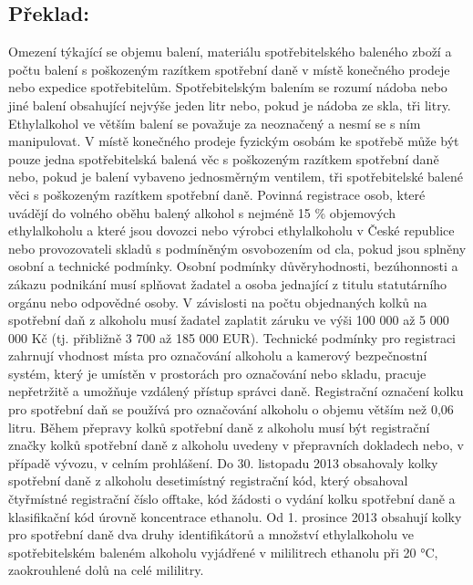 \documentclass[10pt]{article}
\begin{document}
\pagebreak

\subsection*{Překlad:}

Omezení týkající se objemu balení, materiálu spotřebitelského baleného zboží a počtu balení s poškozeným razítkem spotřební daně v místě konečného prodeje nebo expedice spotřebitelům.
Spotřebitelským balením se rozumí nádoba nebo jiné balení obsahující nejvýše jeden litr nebo, pokud je nádoba ze skla, tři litry.
Ethylalkohol ve větším balení se považuje za neoznačený a nesmí se s ním manipulovat.
V místě konečného prodeje fyzickým osobám ke spotřebě může být pouze jedna spotřebitelská balená věc s poškozeným razítkem spotřební daně nebo, pokud je balení vybaveno jednosměrným ventilem, tři spotřebitelské balené věci s poškozeným razítkem spotřební daně.
Povinná registrace osob, které uvádějí do volného oběhu balený alkohol s nejméně 15 \% objemových ethylalkoholu a které jsou dovozci nebo výrobci ethylalkoholu v České republice nebo provozovateli skladů s podmíněným osvobozením od cla, pokud jsou splněny osobní a technické podmínky.
Osobní podmínky důvěryhodnosti, bezúhonnosti a zákazu podnikání musí splňovat žadatel a osoba jednající z titulu statutárního orgánu nebo odpovědné osoby.
V závislosti na počtu objednaných kolků na spotřební daň z alkoholu musí žadatel zaplatit záruku ve výši 100 000 až 5 000 000 Kč (tj. přibližně 3 700 až 185 000 EUR).
Technické podmínky pro registraci zahrnují vhodnost místa pro označování alkoholu a kamerový bezpečnostní systém, který je umístěn v prostorách pro označování nebo skladu, pracuje nepřetržitě a umožňuje vzdálený přístup správci daně.
Registrační označení kolku pro spotřební daň se používá pro označování alkoholu o objemu větším než 0,06 litru.
Během přepravy kolků spotřební daně z alkoholu musí být registrační značky kolků spotřební daně z alkoholu uvedeny v přepravních dokladech nebo, v případě vývozu, v celním prohlášení.
Do 30. listopadu 2013 obsahovaly kolky spotřební daně z alkoholu desetimístný registrační kód, který obsahoval čtyřmístné registrační číslo offtake, kód žádosti o vydání kolku spotřební daně a klasifikační kód úrovně koncentrace ethanolu.
Od 1. prosince 2013 obsahují kolky pro spotřební daně dva druhy identifikátorů a množství ethylalkoholu ve spotřebitelském baleném alkoholu vyjádřené v mililitrech ethanolu při 20 °C, zaokrouhlené dolů na celé mililitry.
\end{document}

